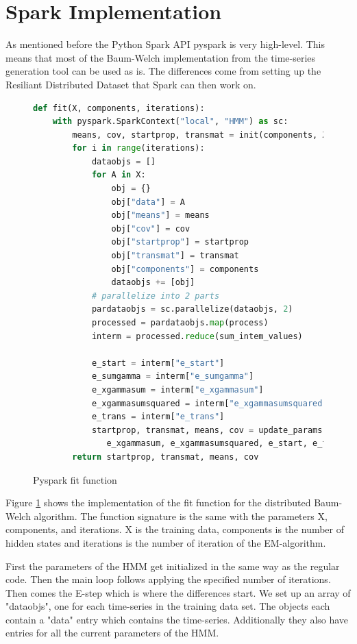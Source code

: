 \section{Spark Implementation}

As mentioned before the Python Spark API pyspark is very high-level. This means that most of the Baum-Welch implementation from the time-series generation tool can be used as is. The differences come from setting up the Resiliant Distributed Dataset that Spark can then work on. 

\begin{figure}
\begin{singlespace}
\begin{lstlisting}[language=Python]
def fit(X, components, iterations):
    with pyspark.SparkContext("local", "HMM") as sc:
        means, cov, startprop, transmat = init(components, X)
        for i in range(iterations):
            dataobjs = []
            for A in X:
                obj = {}
                obj["data"] = A
                obj["means"] = means
                obj["cov"] = cov
                obj["startprop"] = startprop
                obj["transmat"] = transmat
                obj["components"] = components
                dataobjs += [obj]
            # parallelize into 2 parts
            pardataobjs = sc.parallelize(dataobjs, 2)
            processed = pardataobjs.map(process)
            interm = processed.reduce(sum_intem_values)

            e_start = interm["e_start"]
            e_sumgamma = interm["e_sumgamma"]
            e_xgammasum = interm["e_xgammasum"]
            e_xgammasumsquared = interm["e_xgammasumsquared"]
            e_trans = interm["e_trans"]
            startprop, transmat, means, cov = update_params(e_sumgamma, \
               e_xgammasum, e_xgammasumsquared, e_start, e_trans)
        return startprop, transmat, means, cov
\end{lstlisting}
\end{singlespace}
\caption{Pyspark fit function}    
\label{fig:pyspark-fit-listing}
\end{figure}

Figure \ref{fig:pyspark-fit-listing} shows the implementation of the fit function for the distributed Baum-Welch algorithm. The function signature is the same with the parameters X, components, and iterations. X is the training data, components is the number of hidden states and iterations is the number of iteration of the EM-algorithm. 

First the parameters of the HMM get initialized in the same way as the regular code. Then the main loop follows applying the specified number of iterations. Then comes the E-step which is where the differences start. We set up an array of "dataobjs", one for each time-series in the training data set. The objects each contain a "data" entry which contains the time-series. Additionally they also have entries for all the current parameters of the HMM. 


